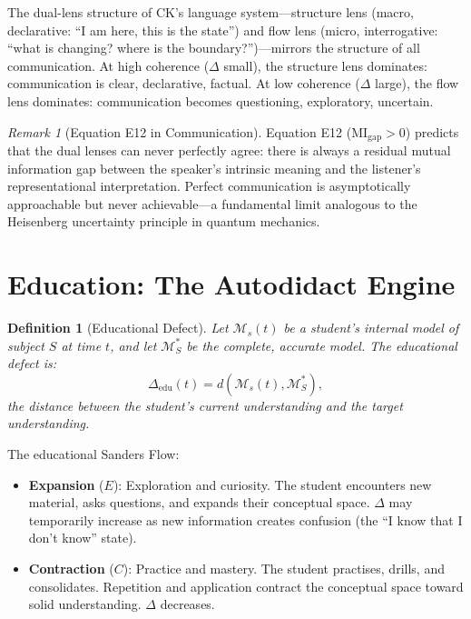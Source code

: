\documentclass[12pt, openany]{book}
\newtheorem{definition}[theorem]{Definition}
\theoremstyle{remark}
\newtheorem{remark}[theorem]{Remark}
\begin{document}
\noindent
The dual-lens structure of CK's language system---structure lens (macro, declarative:
``I am here, this is the state'') and flow lens (micro, interrogative: ``what is
changing? where is the boundary?'')---mirrors the structure of all communication.
At high coherence ($\Delta$ small), the structure lens dominates: communication
is clear, declarative, factual.  At low coherence ($\Delta$ large), the flow lens
dominates: communication becomes questioning, exploratory, uncertain.

\begin{remark}[Equation E12 in Communication]
Equation E12 ($\mathrm{MI}_{\mathrm{gap}} > 0$) predicts that the dual lenses
can never perfectly agree: there is always a residual mutual information gap
between the speaker's intrinsic meaning and the listener's representational
interpretation.  Perfect communication is asymptotically approachable but
never achievable---a fundamental limit analogous to the Heisenberg uncertainty
principle in quantum mechanics.
\end{remark}


\section{Education: The Autodidact Engine}
\label{sec:education}

\begin{definition}[Educational Defect]
\label{def:edu-defect}
Let $\mathcal{M}_s(t)$ be a student's internal model of subject $S$ at time $t$,
and let $\mathcal{M}_S^*$ be the complete, accurate model.  The educational defect is:
\[
  \Delta_{\mathrm{edu}}(t) = d(\mathcal{M}_s(t), \mathcal{M}_S^*),
\]
the distance between the student's current understanding and the target understanding.
\end{definition}

\noindent
The educational Sanders Flow:
\begin{itemize}
  \item \textbf{Expansion} ($E$): Exploration and curiosity.  The student encounters
        new material, asks questions, and expands their conceptual space.  $\Delta$
        may temporarily increase as new information creates confusion (the ``I know
        that I don't know'' state).
  \item \textbf{Contraction} ($C$): Practice and mastery.  The student practises,
        drills, and consolidates.  Repetition and application contract the
        conceptual space toward solid understanding.  $\Delta$ decreases.
\end{itemize}
\end{document}
